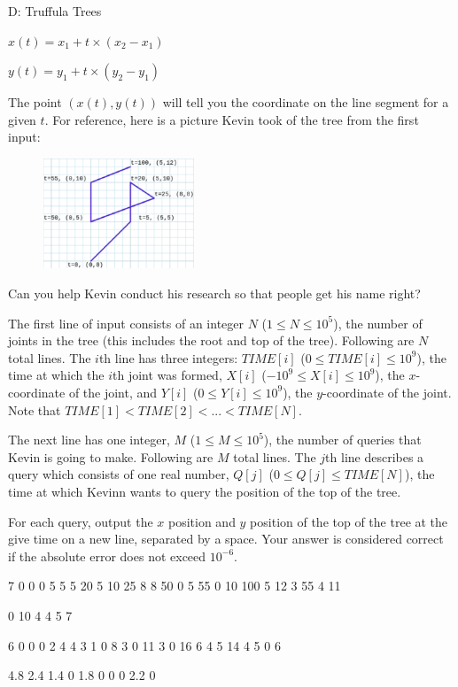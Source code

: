 \begin{problem}{D: Truffula Trees}
\begin{center}
$x(t) = x_1 + t \times (x_2 - x_1)$

$y(t) = y_1 + t \times (y_2 - y_1)$
\end{center}

The point $(x(t), y(t))$ will tell you the coordinate on the line segment for a given $t$. For reference, here is a picture Kevin took of the tree from the first input:

\begin{figure}[h]
    \centering
    \includegraphics[width=0.4\textwidth]{tree.eps}
\end{figure}

Can you help Kevin conduct his research so that people get his name right?

\end{problem}

\begin{formalin}
The first line of input consists of an integer $N$ ($1 \leq N \leq 10^{5}$), the number of joints in the tree (this includes the root and top of the tree). Following are $N$ total lines. The $i$th line has three integers: $TIME[i]$ ($0 \le TIME[i] \le 10^{9}$), the time at which the $i$th joint was formed, $X[i]$ ($-10^{9} \leq X[i] \leq 10^{9}$), the $x$-coordinate of the joint, and $Y[i]$ ($0 \leq Y[i] \leq 10^{9}$), the $y$-coordinate of the joint. Note that $TIME[1] < TIME[2] < ... < TIME[N]$.

The next line has one integer, $M$ ($1 \leq M \leq 10^{5}$), the number of queries that Kevin is going to make. Following are $M$ total lines. The $j$th line describes a query which consists of one real number, $Q[j]$ ($0 \leq Q[j] \leq TIME[N]$), the time at which Kevinn wants to query the position of the top of the tree.
\end{formalin}

\begin{formalout}
For each query, output the $x$ position and $y$ position of the top of the tree at the give time on a new line, separated by a space. Your answer is considered correct if the absolute error does not exceed $10^{-6}$.
\end{formalout}

\begin{datain}
7
0 0 0
5 5 5
20 5 10
25 8 8
50 0 5
55 0 10
100 5 12
3
55
4
11
\end{datain}
\begin{dataout}
0 10
4 4
5 7
\end{dataout}

\begin{datain}
6
0 0 0
2 4 4
3 1 0
8 3 0
11 3 0
16 6 4
5
14
4
5
0
6
\end{datain}
\begin{dataout}
4.8 2.4
1.4 0
1.8 0
0 0
2.2 0
\end{dataout}
